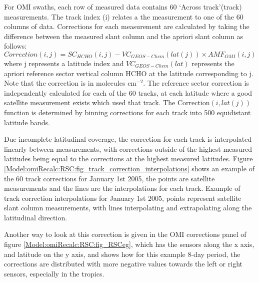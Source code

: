     For OMI swaths, each row of measured data contains 60 `Across track'(track) measurements.
    The track index (i) relates a the measurement to one of the 60 columns of data.
    Corrections for each measurement are calculated by taking the difference between the measured slant column and the apriori slant column as follows:
    \begin{equation} \label{Model:omiRecalc:eqn_RSC}
      Correction(i,j) = SC_{HCHO}(i,j) - VC_{GEOS-Chem}(lat(j)) \times {AMF_{OMI}}(i,j)
    \end{equation}
    where j represents a latitude index and $VC_{GEOS-Chem}(lat)$ represents the apriori reference sector vertical column HCHO at the latitude corresponding to j.
    Note that the correction is in molecules cm$^{-2}$.
    The reference sector correction is independently calculated for each of the 60 tracks, at each latitude where a good satellite measurement exists which used that track.
    The Correction$(i,lat(j))$ function is determined by binning corrections for each track into 500 equidistant latitude bands. 
    
    Due incomplete latitudinal coverage, the correction for each track is interpolated linearly between measurements, with corrections outside of the highest measured latitudes being equal to the corrections at the highest measured latitudes.
    Figure \ref{Model:omiRecalc:RSC:fig_track_correction_interpolations} shows an example of the 60 track corrections for January 1st 2005, the points are satellite measurements and the lines are the interpolations for each track.
      {Example of track correction interpolations for January 1st 2005, points represent satellite slant column measurements, with lines interpolating and extrapolating along the latitudinal direction.}
      {\label{Model:omiRecalc:RSC:fig_track_correction_interpolations}}
    
    Another way to look at this correction is given in the OMI corrections panel of figure \ref{Model:omiRecalc:RSC:fig_RSCeg}, which has the sensors along the x axis, and latitude on the y axis, and shows how for this example 8-day period, the corrections are distributed with more negative values towards the left or right sensors, especially in the tropics.
    
